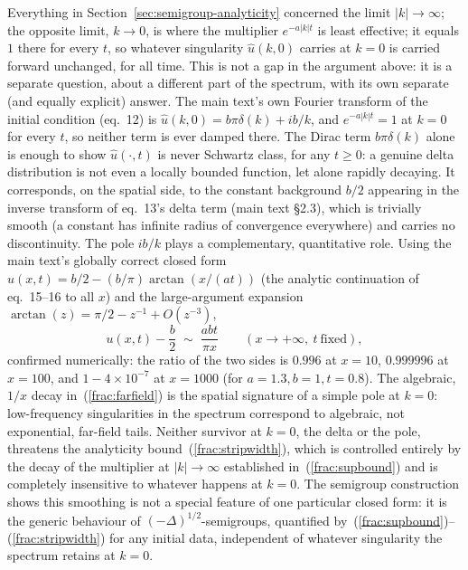 \documentclass{article}
\begin{document}
Everything in Section~\ref{sec:semigroup-analyticity} concerned the limit
$|k|\to\infty$; the opposite limit, $k\to0$, is where the multiplier
$e^{-a|k|t}$ is least effective; it equals $1$ there for every $t$, so
whatever singularity $\hat u(k,0)$ carries at $k=0$ is carried forward
unchanged, for all time. This is not a gap in the argument above: it is a
separate question, about a different part of the spectrum, with its own
separate (and equally explicit) answer. The main text's own Fourier
transform of the initial condition (eq.~12) is
$\hat u(k,0)=b\pi\delta(k)+ib/k$, and $e^{-a|k|t}=1$ at $k=0$ for every $t$,
so neither term is ever damped there. The Dirac term $b\pi\delta(k)$ alone
is enough to show
$\hat u(\cdot,t)$ is never Schwartz class, for any $t\ge0$: a genuine delta
distribution is not even a locally bounded function, let alone
rapidly decaying. It corresponds, on the spatial side, to the constant
background $b/2$ appearing in the inverse transform of eq.~13's delta term
(main text §2.3), which is trivially smooth (a constant has infinite radius
of convergence everywhere) and carries no discontinuity. The pole $ib/k$
plays a complementary, quantitative role. Using the main text's globally
correct closed form $u(x,t)=b/2-(b/\pi)\arctan(x/(at))$ (the analytic
continuation of eq.~15--16 to all $x$) and the large-argument expansion
$\arctan(z)=\pi/2-z^{-1}+O(z^{-3})$,
\begin{equation}
u(x,t) - \frac{b}{2} \;\sim\; \frac{abt}{\pi x} \qquad (x\to+\infty,\ t\ \text{fixed}),
\label{frac:farfield}
\end{equation}
confirmed numerically: the ratio of the two sides is $0.996$ at $x=10$,
$0.999996$ at $x=100$, and $1-4\times10^{-7}$ at $x=1000$ (for
$a=1.3,b=1,t=0.8$). The algebraic, $1/x$ decay in~(\ref{frac:farfield}) is
the spatial signature of a simple pole at $k=0$: low-frequency
singularities in the spectrum correspond to algebraic, not exponential,
far-field tails. Neither survivor at $k=0$, the delta or the pole,
threatens the analyticity bound~(\ref{frac:stripwidth}), which is
controlled entirely by the decay of the multiplier at $|k|\to\infty$
established in~(\ref{frac:supbound}) and is completely insensitive to
whatever happens at $k=0$. The semigroup construction shows this smoothing
is not a special feature of one particular closed form: it is the generic
behaviour of $(-\Delta)^{1/2}$-semigroups, quantified
by~(\ref{frac:supbound})--(\ref{frac:stripwidth}) for any initial data,
independent of whatever singularity the spectrum retains at $k=0$.
\end{document}
